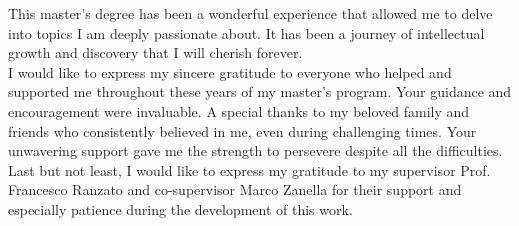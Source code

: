 
This master's degree has been a wonderful experience that allowed me to delve into topics I am deeply passionate about. It has been a journey of intellectual growth and discovery that I will cherish forever. \\

I would like to express my sincere gratitude to everyone who helped and supported me throughout these years of my master's program. Your guidance and encouragement were invaluable. A special thanks to my beloved family and friends who consistently believed in me, even during challenging times. Your unwavering support gave me the strength to persevere despite all the difficulties. \\


Last but not least, I would like to express my gratitude to my supervisor Prof. Francesco Ranzato and co-supervisor Marco Zanella for their support and especially patience during the development of this work.
